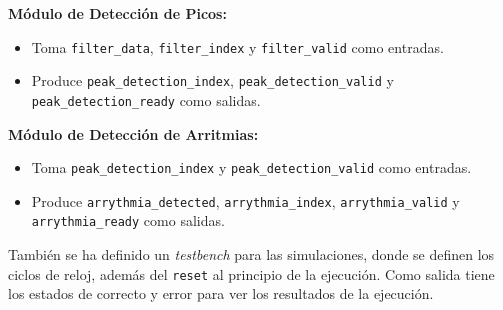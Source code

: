 \textbf{Módulo de Detección de Picos:}
\begin{itemize}
    \item Toma \texttt{filter\_data}, \texttt{filter\_index} y \texttt{filter\_valid} como entradas.
    \item Produce \texttt{peak\_detection\_index}, \texttt{peak\_detection\_valid} y \texttt{peak\_detection\_ready} como salidas.
\end{itemize}

\textbf{Módulo de Detección de Arritmias:}
\begin{itemize}
    \item Toma \texttt{peak\_detection\_index} y \texttt{peak\_detection\_valid} como entradas.
    \item Produce \texttt{arrythmia\_detected}, \texttt{arrythmia\_index}, \texttt{arrythmia\_valid} y \texttt{arrythmia\_ready} como salidas.
\end{itemize}

También se ha definido un \textit{testbench} para las simulaciones, donde se definen los ciclos de reloj, además del \texttt{reset} al principio de la ejecución. Como salida tiene los estados de correcto y error para ver los resultados de la ejecución.